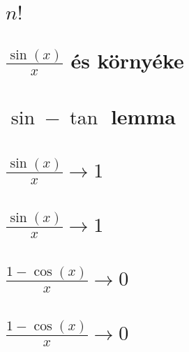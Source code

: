 \begin{spacing}{1.2}
\section*{$n!$} \label{DBnthroot3Mo}
\Mo{

}
\vspace{0.5cm}
\newpage
\section*{$\frac{\sin(x)}{x}$ és környéke} \label{DBsin}
\newline
{}
\newline
{}
\newline
{}
\vspace{0.5cm}
\newpage
\section*{${\sin} -{\tan}$ lemma} \label{DBsinSum}
\Desc{

}
\vspace{0.5cm}
\newpage
\section*{$\frac{\sin(x)}{x}\to 1$} \label{DBsin1}
\Fa{

}
\vspace{0.5cm}
\newpage
\section*{$\frac{\sin(x)}{x}\to 1$} \label{DBsin1Mo}
\Mo{

}
\vspace{0.5cm}
\newpage
\section*{$\frac{1-\cos(x)}{x}\to 0$} \label{DBsin2}
\Fa{

}
\vspace{0.5cm}
\newpage
\section*{$\frac{1-\cos(x)}{x}\to 0$} \label{DBsin2Mo}
\Mo{

}
\vspace{0.5cm}
\newpage

\end{spacing}
